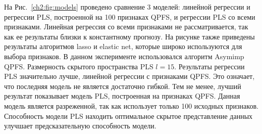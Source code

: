 На Рис.~\ref{ch2:fig:models} проведено сравнение 3 моделей: линейной регрессии и регрессии PLS, построенной на 100 признаках QPFS, и регрессии PLS со всеми признаками.
Линейная регрессия со всеми признаками не рассматривается, так как ее результаты близки к константному прогнозу. На рисунке также приведены результаты алгоритмов lasso и elastic net, которые широко используются для выбора признаков.
В данном эксперименте использовался алгоритм Asymimp QPFS.
Размерность скрытого пространства PLS $l = 15$.
Результаты регрессии PLS значительно лучше, линейной регрессии с признаками QPFS.
Это означает, что последняя модель не является достаточно гибкой.
Тем не менее, лучший результат показывает модель PLS, построенная на признаках QPFS. 
Данная модель является разреженной, так как использует только 100 исходных признаков.
Способность модели PLS находить оптимальное скрытое представление данных улучшает предсказательную способность модели.

